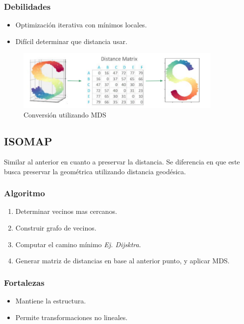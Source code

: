 \documentclass[titlepage,a4paper]{article}
\begin{document}
\subsubsection*{Debilidades}
\begin{itemize}
    \item Optimización iterativa con mínimos locales.
    \item Difícil determinar que distancia usar.
\end{itemize}

\begin{figure}[!htb]
    \centering
    \includegraphics[width=0.9\textwidth]{imagenesResumen/MDS.PNG}
    \caption{Conversión utilizando MDS}
\end{figure}


\subsection{ISOMAP}

Similar al anterior en cuanto a preservar la distancia. Se diferencia en que este busca preservar la geométrica utilizando distancia geodésica.

\subsubsection*{Algoritmo}
\begin{enumerate}
    \item Determinar vecinos mas cercanos.
    \item Construir grafo de vecinos.
    \item Computar el camino mínimo \textit{Ej. Dijsktra}.
    \item Generar matriz de distancias en base al anterior punto, y aplicar MDS.
\end{enumerate}

\subsubsection*{Fortalezas}
\begin{itemize}
    \item Mantiene la estructura.
    \item Permite transformaciones no lineales.
\end{itemize}
\end{document}
